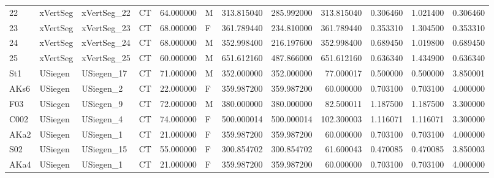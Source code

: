 \begin{tabular}{llllrlrrrrrr}
22     &        xVertSeg &  xVertSeg\_22 &                 CT &  64.000000 &        M &       313.815040 &    285.992000 &  313.815040 &               0.306460 &            1.021400 &          0.306460 \\
23     &        xVertSeg &  xVertSeg\_23 &                 CT &  68.000000 &        F &       361.789440 &    234.810000 &  361.789440 &               0.353310 &            1.304500 &          0.353310 \\
24     &        xVertSeg &  xVertSeg\_24 &                 CT &  68.000000 &        M &       352.998400 &    216.197600 &  352.998400 &               0.689450 &            1.019800 &          0.689450 \\
25     &        xVertSeg &  xVertSeg\_25 &                 CT &  60.000000 &        M &       651.612160 &    487.866000 &  651.612160 &               0.636340 &            1.434900 &          0.636340 \\
St1    &         USiegen &   USiegen\_17 &                 CT &  71.000000 &        M &       352.000000 &    352.000000 &   77.000017 &               0.500000 &            0.500000 &          3.850001 \\
AKs6   &         USiegen &    USiegen\_2 &                 CT &  22.000000 &        F &       359.987200 &    359.987200 &   60.000000 &               0.703100 &            0.703100 &          4.000000 \\
F03    &         USiegen &    USiegen\_9 &                 CT &  72.000000 &        M &       380.000000 &    380.000000 &   82.500011 &               1.187500 &            1.187500 &          3.300000 \\
C002   &         USiegen &    USiegen\_4 &                 CT &  74.000000 &        F &       500.000014 &    500.000014 &  102.300003 &               1.116071 &            1.116071 &          3.300000 \\
AKa2   &         USiegen &    USiegen\_1 &                 CT &  21.000000 &        F &       359.987200 &    359.987200 &   60.000000 &               0.703100 &            0.703100 &          4.000000 \\
S02    &         USiegen &   USiegen\_15 &                 CT &  55.000000 &        F &       300.854702 &    300.854702 &   61.600043 &               0.470085 &            0.470085 &          3.850003 \\
AKa4   &         USiegen &    USiegen\_1 &                 CT &  21.000000 &        F &       359.987200 &    359.987200 &   60.000000 &               0.703100 &            0.703100 &          4.000000 \\

\end{tabular}
